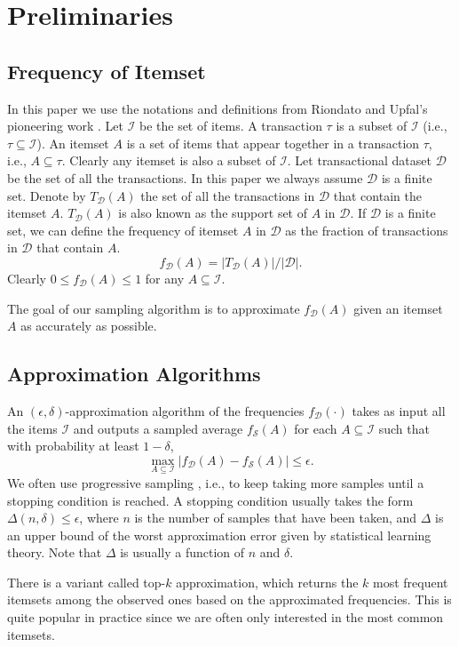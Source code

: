 \documentclass{article}
\begin{document}
\section{Preliminaries}
\label{sec:prlm}
\subsection{Frequency of Itemset}
\newcommand{\I}{\mathcal{I}}
\newcommand{\D}{\mathcal{D}}
In this paper we use the notations and definitions from Riondato and Upfal's pioneering work \cite{RU15}. 
Let $\I$ be the set of items. A transaction $\tau$ is a subset of $\I$ (i.e., $\tau \subseteq \I$).
An itemset $A$ is a set of items that appear together in a transaction $\tau$, i.e., $A \subseteq \tau$. Clearly any itemset is also a subset of $\I$. 
Let transactional dataset $\D$ be the set of all the transactions. In this paper we always assume $\D$ is a finite set. Denote by $T_\D(A)$ the set of all the transactions in $\D$ that contain the itemset $A$. $T_\D(A)$ is also known as the support set of $A$ in $\D$.
If $\D$ is a finite set, we can define the frequency of itemset $A$ in $\D$ as the fraction of transactions in $\D$ that contain $A$.
$$f_\D(A) = |T_\D(A)|/|\D|.$$
Clearly $0 \leq f_\D(A) \leq 1$ for any $A \subseteq \I$.

The goal of our sampling algorithm is to approximate $f_\D(A)$ given an itemset $A$ as accurately as possible.

\subsection{Approximation Algorithms}
\newcommand{\Smp}{\mathcal{S}}
An $(\epsilon,\delta)$-approximation algorithm of the frequencies $f_\D(\cdot)$ takes as input all the items $\I$ and outputs a sampled average $f_\Smp(A)$ for each $A\subseteq\I$ such that with probability at least $1-\delta$,
$$\max_{A\subseteq\I}|f_\D(A) - f_\Smp(A)| \leq \epsilon.$$
We often use progressive sampling \cite{RU15,RU16}, i.e., to keep taking more samples until a stopping condition is reached. A stopping condition usually takes the form $\Delta(n, \delta) \leq \epsilon$, where $n$ is the number of samples that have been taken, and $\Delta$ is an upper bound of the worst approximation error given by statistical learning theory. Note that $\Delta$ is usually a function of $n$ and $\delta$.

There is a variant called top-$k$ approximation, which returns the $k$ most frequent itemsets among the observed ones based on the approximated frequencies. This is quite popular in practice since we are often only interested in the most common itemsets. 
\end{document}
